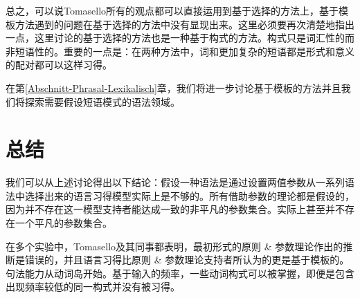 总之，可以说Tomasello所有的观点都可以直接运用到基于选择的方法上，基于模板方法遇到的问题在基于选择的方法中没有显现出来。这里必须要再次清楚地指出一点，这里讨论的基于选择的方法也是一种基于构式的方法。构式只是词汇性的而非短语性的。重要的一点是：在两种方法中，词和更加复杂的短语都是形式和意义的配对都可以这样习得。

在第\ref{Abschnitt-Phrasal-Lexikalisch}章，我们将进一步讨论基于模板的方法并且我们将探索需要假设短语模式的语法领域。

\section{总结}

我们可以从上述讨论得出以下结论：假设一种语法是通过设置两值参数从一系列语法中选择出来的语言习得模型实际上是不够的。所有借助参数的理论都是假设的，因为并不存在这一模型支持者能达成一致的非平凡的参数集合。实际上甚至并不存在一个平凡的参数集合。

在多个实验中，Tomasello及其同事都表明，最初形式的原则 \& 参数理论作出的推断是错误的，并且语言习得比原则 \& 参数理论支持者所认为的更是基于模板的。句法能力从动词岛开始。基于输入的频率，一些动词构式可以被掌握，即便是包含出现频率较低的同一构式并没有被习得。

